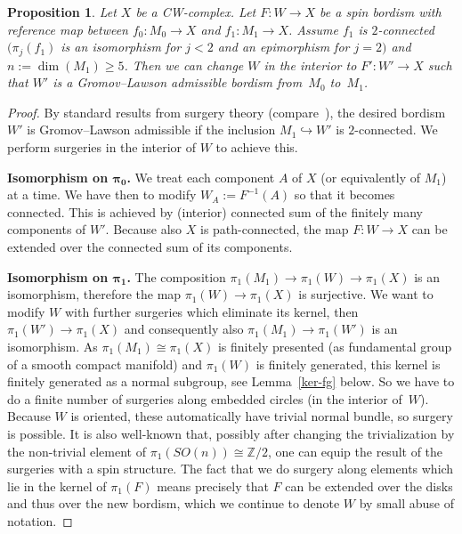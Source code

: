 \documentclass[pdftex]{sigma}
\numberwithin{equation}{section}
\newtheorem{Proposition}[Theorem]{Proposition}
 { \theoremstyle{definition}
\newtheorem{Example}[Theorem]{Example}
\newtheorem{Remark}[Theorem]{Remark} }
\newcommand{\integers}{\mathbb{Z}}
\newcommand{\into}{\hookrightarrow}
\begin{document}
\begin{Proposition}\label{prop:change_bord} Let $X$ be a CW-complex.
 Let $F\colon W\to X$ be a spin bordism with reference map between $f_0\colon
 M_0\to X$ and $f_1\colon M_1\to X$. Assume $f_1$ is
 $2$-connected $(\pi_j(f_1)$ is an isomorphism for $j<2$ and an epimorphism
 for $j=2)$ and
 $n:=\dim(M_1)\ge 5$. Then we
 can change $W$ in the interior to $F'\colon W'\to X$ such that $W'$ is a
 Gromov--Lawson admissible bordism from~$M_0$ to~$M_1$.
\end{Proposition}
\begin{proof}
 By standard results from surgery theory (compare~\cite{Wall}), the desired bordism $W'$ is
 Gromov--Lawson admissible if the inclusion $M_1\into W'$ is $2$-connected. We
 perform surgeries in the interior of $W$ to achieve this.

 \textbf{Isomorphism on $\boldsymbol{\pi_0}$.} We treat each component $A$ of $X$ (or
 equivalently of $M_1$) at a time. We have then to modify $W_A:=F^{-1}(A)$
 so that it becomes connected. This is achieved by (interior) connected sum
 of the finitely many components of $W'$. Because also $X$ is
 path-connected, the map $F\colon W\to X$ can be extended over the
 connected sum of its components.

 \textbf{Isomorphism on $\boldsymbol{\pi_1}$.} The composition $\pi_1(M_1)\to
 \pi_1(W)\to \pi_1(X)$ is an isomorphism, therefore the map $\pi_1(W)\to
 \pi_1(X)$ is surjective. We want to modify $W$ with further
 surgeries which eliminate
 its kernel, then $\pi_1(W')\to\pi_1(X)$ and consequently also $\pi_1(M_1)\to
 \pi_1(W')$ is an isomorphism. As $\pi_1(M_1)\cong \pi_1(X)$ is
 finitely presented (as fundamental group of a smooth compact manifold)
 and $\pi_1(W)$ is finitely generated, this
 kernel is finitely generated as a normal subgroup, see Lemma~\ref{ker-fg} below. So we have to do a finite
 number of surgeries along embedded circles (in the interior of~$W$). Because
 $W$ is oriented, these automatically have trivial normal bundle, so surgery
 is possible. It is also well-known that, possibly after changing the trivialization by the non-trivial element of
 $\pi_1(SO(n))\cong \integers/2$, one can equip the result of the surgeries
 with a spin structure. The fact
 that we do surgery along elements which lie in the kernel of
 $\pi_1(F)$ means precisely that $F$ can be extended over the disks and thus
 over the new bordism, which we continue to denote $W$ by small abuse of
 notation.


\end{proof}
\end{document}
